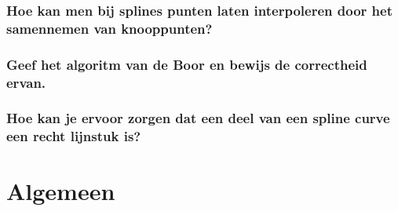 \documentclass[12pt,a4paper]{article}
\begin{document}
\section{Hoe kan men bij splines punten laten interpoleren door het samennemen van knooppunten?}
\section{Geef het algoritm van de Boor en bewijs de correctheid ervan.}
\section{Hoe kan je ervoor zorgen dat een deel van een spline curve een recht lijnstuk is?}
\fi

\part{Algemeen}


\iffalse
\section{bespreek het algoritme voor het bepalen van de onderbrug en bovenbrug waarom is de kleinste y-coordinaat een slechte schatting voor het bepalen van de onderbrug?}
\section{geef een algoritme dat in O(N log N) bewerkingen nagaat of in een vz van N lijnstukken er snijdende lijnstukken in voorkomen}
\section{Bewijs correctheid van dit algoritme geef beknopt hoe dit algoritme en de gegevensstrukturen moeten aangepast worden om alle snijdingen te vinden}
\section{geef een algoritme voor de berekening van het VPP van een vz van N punten in O(nlog n) bewerkingen verantwoord de rekencomplexiteit.}
\section{bespreek graham scan + correctheidsbewijs + toon aan dat dit O(nlogn)bewerkingen gebeurt}
\section{wanneer is de inpakmethode (jarvis march) efficienter dan de methode van graham (graham scan)}
\fi
\end{document}
